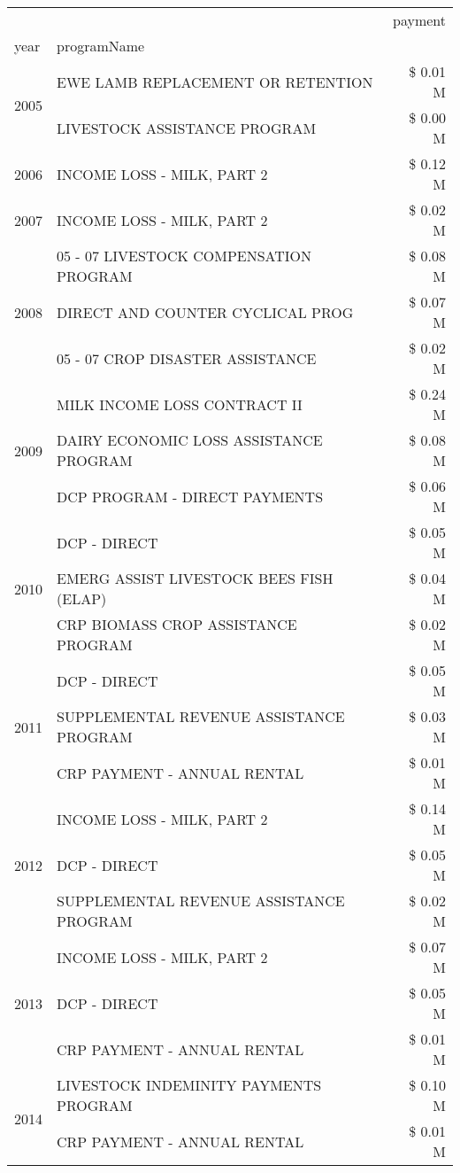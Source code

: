 \begin{tabular}{llr}
\toprule
 &  & payment \\
year & programName &  \\
\midrule
\multirow[t]{2}{*}{2005} & EWE LAMB REPLACEMENT OR RETENTION & \$ 0.01 M \\
 & LIVESTOCK ASSISTANCE PROGRAM & \$ 0.00 M \\
\cline{1-3}
2006 & INCOME LOSS - MILK, PART 2 & \$ 0.12 M \\
\cline{1-3}
2007 & INCOME LOSS - MILK, PART 2 & \$ 0.02 M \\
\cline{1-3}
\multirow[t]{3}{*}{2008} & 05 - 07 LIVESTOCK COMPENSATION PROGRAM & \$ 0.08 M \\
 & DIRECT AND COUNTER CYCLICAL PROG & \$ 0.07 M \\
 & 05 - 07 CROP DISASTER ASSISTANCE & \$ 0.02 M \\
\cline{1-3}
\multirow[t]{3}{*}{2009} & MILK INCOME LOSS CONTRACT II & \$ 0.24 M \\
 & DAIRY ECONOMIC LOSS ASSISTANCE PROGRAM & \$ 0.08 M \\
 & DCP PROGRAM - DIRECT PAYMENTS & \$ 0.06 M \\
\cline{1-3}
\multirow[t]{3}{*}{2010} & DCP - DIRECT & \$ 0.05 M \\
 & EMERG ASSIST LIVESTOCK BEES FISH (ELAP) & \$ 0.04 M \\
 & CRP BIOMASS CROP ASSISTANCE PROGRAM & \$ 0.02 M \\
\cline{1-3}
\multirow[t]{3}{*}{2011} & DCP - DIRECT & \$ 0.05 M \\
 & SUPPLEMENTAL REVENUE ASSISTANCE PROGRAM & \$ 0.03 M \\
 & CRP PAYMENT - ANNUAL RENTAL & \$ 0.01 M \\
\cline{1-3}
\multirow[t]{3}{*}{2012} & INCOME LOSS - MILK, PART 2 & \$ 0.14 M \\
 & DCP - DIRECT & \$ 0.05 M \\
 & SUPPLEMENTAL REVENUE ASSISTANCE PROGRAM & \$ 0.02 M \\
\cline{1-3}
\multirow[t]{3}{*}{2013} & INCOME LOSS - MILK, PART 2 & \$ 0.07 M \\
 & DCP - DIRECT & \$ 0.05 M \\
 & CRP PAYMENT - ANNUAL RENTAL & \$ 0.01 M \\
\cline{1-3}
\multirow[t]{2}{*}{2014} & LIVESTOCK INDEMINITY PAYMENTS PROGRAM & \$ 0.10 M \\
 & CRP PAYMENT - ANNUAL RENTAL & \$ 0.01 M \\

\end{tabular}
